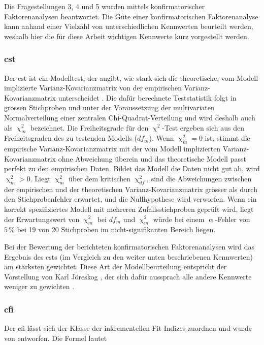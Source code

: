\documentclass[11pt, twoside, a4paper]{book}		%
\begin{document}
Die Fragestellungen 3, 4 und 5 wurden mittels konfirmatorischer Faktorenanalysen beantwortet. Die Güte einer konfirmatorischen Faktorenanalyse kann anhand einer Vielzahl von unterschiedlichen Kennwerten beurteilt werden, weshalb hier die für diese Arbeit wichtigen Kennwerte kurz vorgestellt werden.

\subsubsection*{\gls{cst}}

Der \gls{cst} ist ein Modelltest, der angibt, wie stark sich die theoretische, vom Modell implizierte Var\-ianz-Ko\-var\-ianz\-ma\-trix von der empirischen Var\-ianz-Ko\-var\-ianz\-ma\-trix unterscheidet \citep{Kline2011}. Die dafür berechnete Teststatistik folgt in grossen Stichproben und unter der Voraussetzung der multivariaten Normalverteilung einer zentralen Chi-Quad\-rat-Ver\-teil\-ung und wird deshalb auch als $\upchi^2_{m}$ bezeichnet. Die Freiheitsgrade für den $\upchi^2$-Test ergeben sich aus den Freiheitsgraden des zu testenden Modells ($df_{m}$). Wenn $\upchi^2_{m}=0$ ist, stimmt die empirische Var\-ianz-Ko\-var\-ianz\-ma\-trix mit der vom Modell implizierten Varianz-Kovarianzmatrix ohne Abweichung überein und das theoretische Modell passt perfekt zu den empirischen Daten. Bildet das Modell die Daten nicht gut ab, wird $\upchi^2_{m}>0$. Liegt $\upchi^2_{m}$ über dem kritischen $\upchi^2_{df}$, sind die Abweichungen zwischen der empirischen und der theoretischen Varianz-Kovarianzmatrix grösser als durch den Stichprobenfehler erwartet, und die Nullhypothese wird verworfen. Wenn ein korrekt spezifiziertes Modell mit mehreren Zufallsstichproben geprüft wird, liegt der Erwartungswert von $\upchi^2_{m}$ bei $df_{m}$ und $\upchi^2_{m}$ würde bei einem $\upalpha$-Fehler von $5\,\%$ bei 19 von 20 Stichproben im nicht-signifikanten Bereich liegen.

Bei der Bewertung der berichteten konfirmatorischen Faktorenanalysen wird das Ergebnis des \gls{cst}s (im Vergleich zu den weiter unten beschriebenen Kennwerten) am stärksten gewichtet. Diese Art der Modellbeurteilung entspricht der Vorstellung von Karl Jöreskog \citep[][S. 10]{Soerbom2001}, der sich dafür aussprach alle andere Kennwerte weniger zu gewichten \citep[siehe auch][]{Hayduk2007}.

\subsubsection*{\gls{cfi}}
Der \gls{cfi} lässt sich der Klasse der inkrementellen Fit-Indizes zuordnen und wurde von \citet{Bentler1990} entworfen. Die Formel lautet
\end{document}

